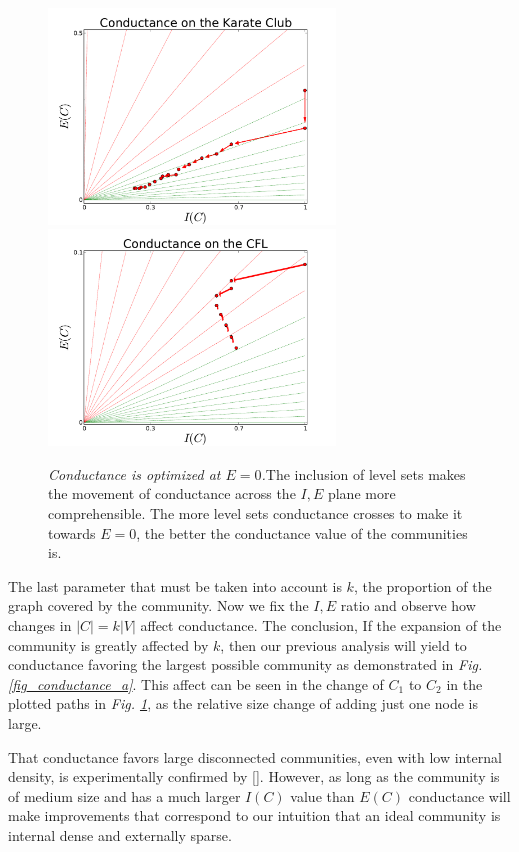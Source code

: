 \documentclass[conference]{IEEEtran}
\begin{document}
\begin{figure}[!h]
\centering
\includegraphics[width=3in]{Figures/karate_conductance}
\includegraphics[width=3in]{Figures/football_conductance}
\caption{{\it Conductance is optimized at $E=0$.}The inclusion of level sets makes the movement of conductance across the $I,E$ plane more comprehensible.  The more level sets conductance crosses to make it towards $E=0$, the better the conductance value of the communities is.}
\label{fig_conductance_karate}
\end{figure}

The last parameter that must be taken into account is $k$, the proportion of the graph covered by the community.  Now we fix the $I, E$ ratio and observe how changes in $|C| = k |V|$ affect conductance.  The conclusion,   If the expansion of the community is greatly affected by $k$, then our previous analysis will yield to conductance favoring the largest possible community as demonstrated in {\it Fig. \ref{fig_conductance_a}}.  This affect can be seen in the change of $C_1$ to $C_2$ in the plotted paths in {\it Fig. \ref{fig_conductance_karate}}, as the relative size change of adding just one node is large.

That conductance favors large disconnected communities, even with low internal density, is experimentally confirmed by [].  However, as long as the community is of medium size and has a much larger $I(C)$ value than $E(C)$ conductance will make improvements that correspond to our intuition that an ideal community is internal dense and externally sparse.
\end{document}
